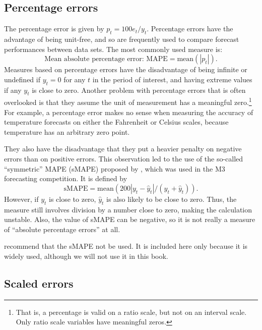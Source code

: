 \documentclass[]{book}
\let\rmarkdownfootnote\footnote%
\def\footnote{\protect\rmarkdownfootnote}
\begin{document}
\hypertarget{percentage-errors}{%
\subsection*{Percentage errors}\label{percentage-errors}}

The percentage error is given by \(p_{t} = 100 e_{t}/y_{t}\). Percentage errors have the advantage of being unit-free, and so are frequently used to compare forecast performances between data sets. The most commonly used measure is:
\[
  \text{Mean absolute percentage error: MAPE} = \text{mean}(|p_{t}|).
\]
Measures based on percentage errors have the disadvantage of being infinite or undefined if \(y_{t}=0\) for any \(t\) in the period of interest, and having extreme values if any \(y_{t}\) is close to zero. Another problem with percentage errors that is often overlooked is that they assume the unit of measurement has a meaningful zero.\footnote{That is, a percentage is valid on a ratio scale, but not on an interval scale. Only ratio scale variables have meaningful zeros.} For example, a percentage error makes no sense when measuring the accuracy of temperature forecasts on either the Fahrenheit or Celsius scales, because temperature has an arbitrary zero point.

They also have the disadvantage that they put a heavier penalty on negative errors than on positive errors. This observation led to the use of the so-called ``symmetric'' MAPE (sMAPE) proposed by \citet[~p.348]{Armstrong85}, which was used in the M3 forecasting competition. It is defined by
\[
  \text{sMAPE} = \text{mean}\left(200|y_{t} - \hat{y}_{t}|/(y_{t}+\hat{y}_{t})\right).
\]
However, if \(y_{t}\) is close to zero, \(\hat{y}_{t}\) is also likely to be close to zero. Thus, the measure still involves division by a number close to zero, making the calculation unstable. Also, the value of sMAPE can be negative, so it is not really a measure of ``absolute percentage errors'' at all.

\citet{HK06} recommend that the sMAPE not be used. It is included here only because it is widely used, although we will not use it in this book.

\hypertarget{scaled-errors}{%
\subsection*{Scaled errors}\label{scaled-errors}}
\end{document}
